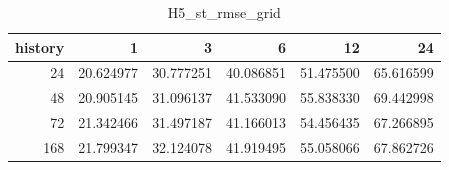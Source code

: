 \begin{table}
\caption{H5_st_rmse_grid}
\label{tab:H5_st_rmse_grid}
\begin{tabular}{rrrrrr}
\toprule
history & 1 & 3 & 6 & 12 & 24 \\
\midrule
24 & 20.624977 & 30.777251 & 40.086851 & 51.475500 & 65.616599 \\
48 & 20.905145 & 31.096137 & 41.533090 & 55.838330 & 69.442998 \\
72 & 21.342466 & 31.497187 & 41.166013 & 54.456435 & 67.266895 \\
168 & 21.799347 & 32.124078 & 41.919495 & 55.058066 & 67.862726 \\
\bottomrule
\end{tabular}
\end{table}
